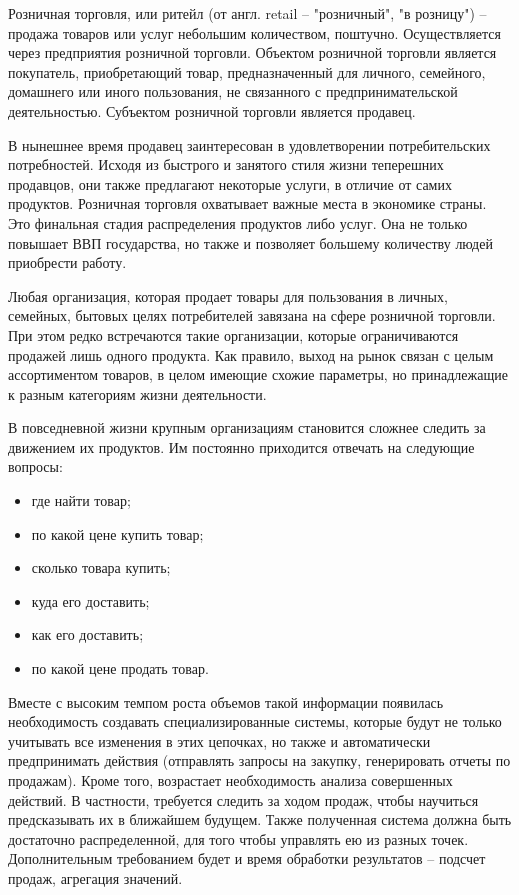 \setcounter{page}{2}

Розничная торговля, или ритейл (от англ. retail – "розничный", "в розницу") – продажа товаров или услуг небольшим количеством, поштучно. Осуществляется через предприятия розничной торговли. Объектом розничной торговли является покупатель, приобретающий товар, предназначенный для личного, семейного, домашнего или иного пользования, не связанного с предпринимательской деятельностью. Субъектом розничной торговли является продавец.

В нынешнее время продавец заинтересован в удовлетворении потребительских потребностей. Исходя из быстрого и занятого стиля жизни теперешних продавцов, они также предлагают некоторые услуги, в отличие от самих продуктов. Розничная торговля охватывает важные места в экономике страны. Это финальная стадия распределения продуктов либо услуг. Она не только повышает ВВП государства, но также и позволяет большему количеству людей приобрести работу.

Любая организация, которая продает товары для пользования в личных, семейных, бытовых целях потребителей завязана на сфере розничной торговли. При этом редко встречаются такие организации, которые ограничиваются продажей лишь одного продукта. Как правило, выход на рынок связан с целым ассортиментом товаров, в целом имеющие схожие параметры, но принадлежащие к разным категориям жизни деятельности.

В повседневной жизни крупным организациям становится сложнее следить за движением их продуктов. Им постоянно приходится отвечать на следующие вопросы:
\begin{itemize}
  \item где найти товар;
  \item по какой цене купить товар;
  \item сколько товара купить;
  \item куда его доставить;
  \item как его доставить;
  \item по какой цене продать товар.
\end{itemize}

Вместе с высоким темпом роста объемов такой информации появилась необходимость создавать специализированные системы, которые будут не только учитывать все изменения в этих цепочках, но также и автоматически предпринимать действия (отправлять запросы на закупку, генерировать отчеты по продажам). Кроме того, возрастает необходимость анализа совершенных действий. В частности, требуется следить за ходом продаж, чтобы научиться предсказывать их в ближайшем будущем. Также полученная система должна быть достаточно распределенной, для того чтобы управлять ею из разных точек. Дополнительным требованием будет и время обработки результатов – подсчет продаж, агрегация значений.

